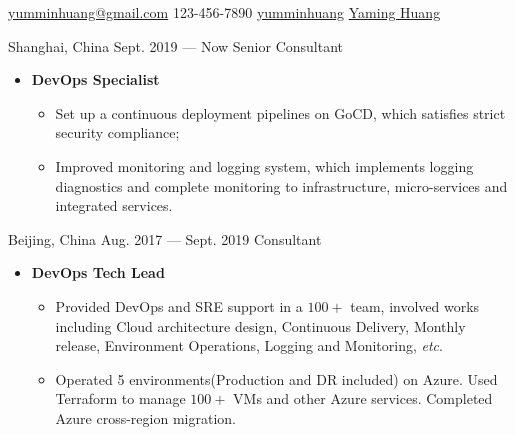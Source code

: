 \documentclass{resume}
\begin{document}
{\href{mailto:yumminhuang@gmail.com}{yumminhuang@gmail.com}}
{123-456-7890}
{\href{https://github.com/yumminhuang}{yumminhuang}}
{\href{https://www.linkedin.com/in/yaming-huang-6a09325b}{Yaming Huang}}
{}


\begin{body}
	{Shanghai, China}
	{Sept. 2019 --- Now}
	{Senior Consultant}
	\begin{itemize}
		\item {} \textbf{DevOps Specialist}
		\begin{itemize}[noitemsep,topsep=0pt]
			\item Set up a continuous deployment pipelines on GoCD, which satisfies strict security compliance;
			\item Improved monitoring and logging system, which implements logging diagnostics and complete monitoring to infrastructure, micro-services and integrated services.
		\end{itemize}
	\end{itemize}
	{Beijing, China}
	{Aug. 2017 --- Sept. 2019}
	{Consultant}
	\begin{itemize}
		\item {} \textbf{DevOps Tech Lead}
		\begin{itemize}[noitemsep,topsep=0pt]
			\item Provided DevOps and SRE support in a $100+$ team, involved works including Cloud architecture design, Continuous Delivery, Monthly release, Environment Operations, Logging and Monitoring, \textit{etc}.
			\item Operated 5 environments(Production and DR included) on Azure. Used Terraform to manage $100+$ VMs and other Azure services. Completed Azure cross-region migration.

\end{itemize}
\end{itemize}
\end{body}
\end{document}
